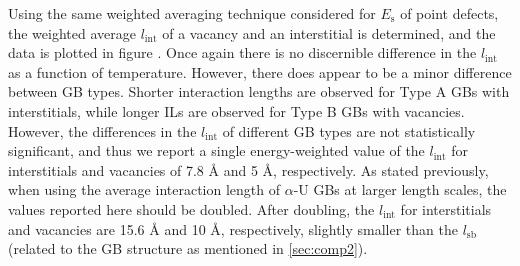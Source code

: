 \documentclass[review]{elsarticle}
\begin{document}

\par Using the same weighted averaging technique considered for $E_{\mathrm{s}}$ of point defects, the weighted average $l_{\mathrm{int}}$ of a vacancy and an interstitial is determined, and the data is plotted in figure . Once again there is no discernible difference in the  $l_{\mathrm{int}}$ as a function of temperature. However, there does appear to be a minor difference between GB types. Shorter interaction lengths are observed for Type A GBs with interstitials, while longer ILs are observed for Type B GBs with vacancies. However, the differences in the $l_{\mathrm{int}}$ of different GB types are not statistically significant, and thus we report a single energy-weighted value of the $l_{\mathrm{int}}$ for interstitials and vacancies of 7.8 {\AA} and 5 {\AA}, respectively. As stated previously, when using the average interaction length of $\alpha$-U GBs at larger length scales, the values reported here should be doubled. After doubling, the $l_{\mathrm{int}}$ for interstitials and vacancies are 15.6 {\AA} and 10 {\AA}, respectively, slightly smaller than the $l_{\mathrm{sb}}$ (related to the GB structure as mentioned in \ref{sec:comp2}). 

\end{document}
